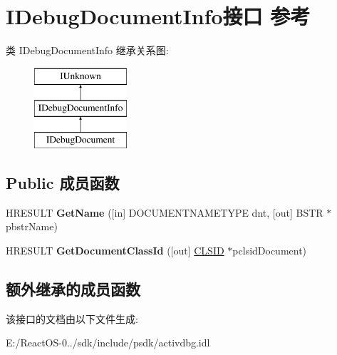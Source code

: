 \hypertarget{interface_i_debug_document_info}{}\section{I\+Debug\+Document\+Info接口 参考}
\label{interface_i_debug_document_info}
类 I\+Debug\+Document\+Info 继承关系图\+:\begin{figure}[H]
\begin{center}
\leavevmode
\includegraphics[height=3.000000cm]{interface_i_debug_document_info}
\end{center}
\end{figure}
\subsection*{Public 成员函数}
\begin{DoxyCompactItemize}
\item 
\mbox{\label{interface_i_debug_document_info_a59e4f17b6c70a65f276d2b051877c9ba}} 
H\+R\+E\+S\+U\+LT {\bfseries Get\+Name} (\mbox{[}in\mbox{]} D\+O\+C\+U\+M\+E\+N\+T\+N\+A\+M\+E\+T\+Y\+PE dnt, \mbox{[}out\mbox{]} B\+S\+TR $\ast$pbstr\+Name)
\item 
\mbox{\label{interface_i_debug_document_info_aa2128c36fbc562b3cfc2dd0ad125fff7}} 
H\+R\+E\+S\+U\+LT {\bfseries Get\+Document\+Class\+Id} (\mbox{[}out\mbox{]} \hyperlink{struct___i_i_d}{C\+L\+S\+ID} $\ast$pclsid\+Document)
\end{DoxyCompactItemize}
\subsection*{额外继承的成员函数}


该接口的文档由以下文件生成\+:\begin{DoxyCompactItemize}
\item 
E\+:/\+React\+O\+S-\/0../sdk/include/psdk/activdbg.\+idl\end{DoxyCompactItemize}
